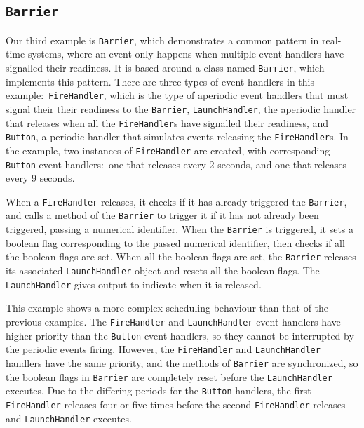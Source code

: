 
\subsection{\texorpdfstring{\texttt{Barrier}}{Barrier}}

Our third example is \texttt{Barrier}, which demonstrates a common
pattern in real-time systems, where an event only happens when
multiple event handlers have signalled their readiness.
It is based around a class named \texttt{Barrier}, which implements
this pattern.
There are three types of event handlers in this
example:~\texttt{FireHandler}, which is the type of aperiodic event
handlers that must signal their their readiness to the
\texttt{Barrier}, \texttt{LaunchHandler}, the aperiodic handler that
releases when all the \texttt{FireHandler}s have signalled their
readiness, and \texttt{Button}, a periodic handler that simulates
events releasing the \texttt{FireHandler}s.
In the example, two instances of \texttt{FireHandler} are created,
with corresponding \texttt{Button} event handlers:~one that releases
every 2 seconds, and one that releases every 9 seconds.

When a \texttt{FireHandler} releases, it checks if it has already
triggered the \texttt{Barrier}, and calls a method of the
\texttt{Barrier} to trigger it if it has not already been triggered,
passing a numerical identifier.
When the \texttt{Barrier} is triggered, it sets a boolean flag
corresponding to the passed numerical identifier, then checks if all
the boolean flags are set.
When all the boolean flags are set, the \texttt{Barrier} releases its
associated \texttt{LaunchHandler} object and resets all the boolean
flags.
The \texttt{LaunchHandler} gives output to indicate when it is
released.

This example shows a more complex scheduling behaviour than that of
the previous examples.
The \texttt{FireHandler} and \texttt{LaunchHandler} event handlers
have higher priority than the \texttt{Button} event handlers, so they
cannot be interrupted by the periodic events firing.
However, the \texttt{FireHandler} and \texttt{LaunchHandler} handlers
have the same priority, and the methods of \texttt{Barrier} are
synchronized, so the boolean flags in \texttt{Barrier} are completely
reset before the \texttt{LaunchHandler} executes.
Due to the differing periods for the \texttt{Button} handlers, the
first \texttt{FireHandler} releases four or five times before the second
\texttt{FireHandler} releases and \texttt{LaunchHandler} executes.

